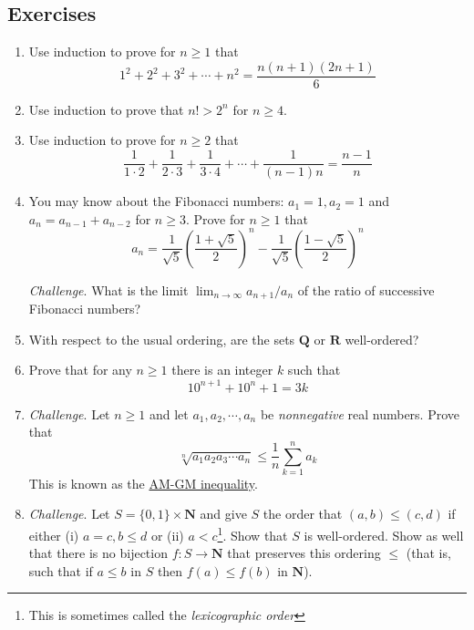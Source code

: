 \documentclass[12pt]{article}
\numberwithin{equation}{subsection}
\theoremstyle{note}
\begin{document}
\subsection{Exercises} 
\begin{enumerate}[label=\arabic*.]
	\item Use induction to prove for $n\geq 1$ that \[ 1^2+2^2+3^2+\cdots+n^2=\dfrac{n(n+1)(2n+1)}{6}\] 
	\item Use induction to prove that $n!>2^n$ for $n\geq 4$. 
	\item Use induction to prove for $n\geq 2$ that \[ \dfrac{1}{1\cdot 2} + \dfrac{1}{2\cdot 3} + \dfrac{1}{3\cdot 4} +\cdots + \dfrac{1}{(n-1)n} = \dfrac{n-1}{n}\]
	\item You may know about the Fibonacci numbers: $a_1=1, a_2=1$ and $a_{n}=a_{n-1}+a_{n-2}$ for $n\geq 3$. Prove for $n\geq 1$ that \[ a_n=\dfrac{1}{\sqrt{5}}  \left( \dfrac{1+\sqrt{5}}{2} \right)^n- \dfrac{1}{\sqrt{5}}\left(\dfrac{1-\sqrt{5}}{2}\right)^n\]  
	
	\textit{Challenge}. What is the limit $\lim_{n\to \infty} a_{n+1}/a_n$ of the ratio of successive Fibonacci numbers?
	\item With respect to the usual ordering, are the sets $\mathbf{Q}$ or $\mathbf{R}$ well-ordered?
	
	\item Prove that for any $n\geq 1$ there is an integer $k$ such that \[ 10^{n+1}+10^{n}+1=3k\] 
	
	\item \textit{Challenge}. Let $n\geq 1$ and let $a_1,a_2,\cdots, a_n$ be \textit{nonnegative} real numbers. Prove that \[ \sqrt[n]{a_1a_2a_3\cdots a_n}\leq \dfrac{1}{n} \sum_{k=1}^n a_k\] This is known as the \href{https://en.wikipedia.org/wiki/AM\%E2\%80\%93GM_inequality}{AM-GM inequality}.
	\item \textit{Challenge}. Let $S=\{0,1\}\times \mathbf{N}$ and give $S$ the order that $(a,b)\leq (c,d)$ if either (i)  $a=c, b\leq d$ or (ii)  $a<c$\footnote{This is sometimes called the \textit{lexicographic order}}. Show that $S$ is well-ordered. Show as well that there is no bijection $f\colon S\to \mathbf{N}$ that preserves this ordering $\leq$ (that is, such that if $a\leq b$ in $S$ then $f(a)\leq f(b)$ in $\mathbf{N}$).
\end{enumerate}
\end{document}
